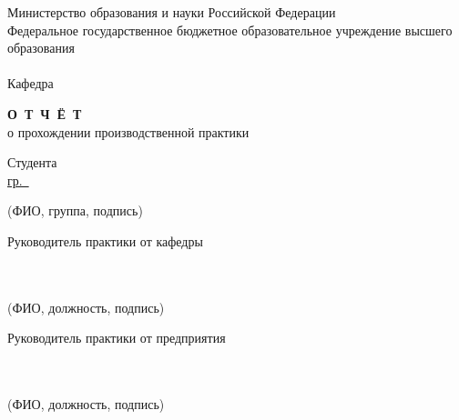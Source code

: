 \begin{titlepage}
	\newpage

	

	\makeatletter

	\begin{center}
		Министерство образования и науки Российской Федерации \\
		Федеральное государственное бюджетное образовательное учреждение
		высшего образования \\
		\university \\
		\vspace{0.8cm}
		Кафедра 
	\end{center}

	\vspace{1cm}

	\begin{center}
		{\Large \bf О~Т~Ч~Ё~Т} \\
		о прохождении производственной практики \\
		\variant
	\end{center}

	\vspace{1cm}


	\begin{flushright}
		\begin{minipage}[H]{0.6\textwidth}
			\linespread{1.3}
			Студента \uline{\yourName\hfill} \\
			\uline{гр.~\group\hfill} \\
			\begin{centering}
				\footnotesize (ФИО, группа, подпись) \\
			\end{centering}
			\vspace{0.3cm}
			Руководитель практики от кафедры \\
			\uline{\deptChiefName\hfill} \\
			\uline{\deptChiefPosition\hfill} \\
			\begin{centering}
				\footnotesize (ФИО, должность, подпись) \\
			\end{centering}
			\vspace{0.3cm}
			Руководитель практики от предприятия \\
			\uline{\orgChiefName\hfill} \\
			\uline{\orgChiefPosition\hfill} \\
			\begin{centering}
				\footnotesize (ФИО, должность, подпись) \\
			\end{centering}
			\vspace{0.3cm}


\end{minipage}
\end{flushright}
\end{titlepage}
